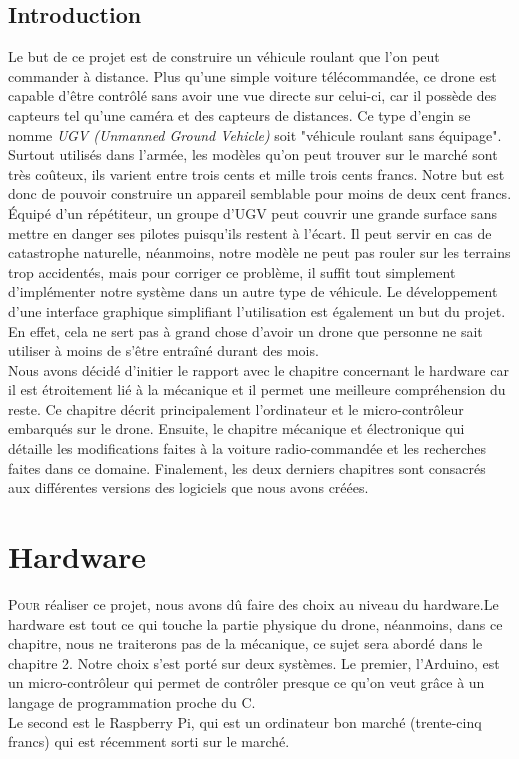 \documentclass[a4paper,11pt]{report}
\begin{document}
{\section*{Introduction}
Le but de ce projet est de construire un véhicule roulant que l'on peut commander à distance. Plus qu'une simple voiture télécommandée, ce drone est capable d'être contrôlé sans avoir une vue directe sur celui-ci, car il possède des capteurs tel qu'une caméra et des capteurs de distances. Ce type d'engin se nomme \textit{UGV (Unmanned Ground Vehicle)} soit "véhicule roulant sans équipage". Surtout utilisés dans l'armée, les modèles qu'on peut trouver sur le marché sont très coûteux, ils varient entre trois cents et mille trois cents francs. Notre but est donc de pouvoir construire un appareil semblable pour moins de deux cent francs. Équipé d'un répétiteur, un groupe d'UGV peut couvrir une grande surface sans mettre en danger ses pilotes puisqu'ils restent à l'écart. Il peut servir en cas de catastrophe naturelle, néanmoins, notre modèle ne peut pas rouler sur les terrains trop accidentés, mais pour corriger ce problème, il suffit tout simplement d'implémenter notre système dans un autre type de véhicule. Le développement d'une interface graphique simplifiant l'utilisation est également un but du projet. En effet, cela ne sert pas à grand chose d'avoir un drone que personne ne sait utiliser à moins de s'être entraîné durant des mois.\\
Nous avons décidé d'initier le rapport avec le chapitre concernant le hardware car il est étroitement lié à la mécanique et il permet une meilleure compréhension du reste. Ce chapitre décrit principalement l'ordinateur et le micro-contrôleur \cite{microcontroleur} embarqués sur le drone. Ensuite, le chapitre mécanique et électronique qui détaille les modifications faites à la voiture radio-commandée et les recherches faites dans ce domaine. Finalement, les deux derniers chapitres sont consacrés aux différentes versions des logiciels que nous avons créées.
\clearpage


\chapter{Hardware}


\lettrine{P}{our} réaliser ce projet, nous avons dû faire des choix au niveau du hardware.Le hardware est tout ce qui touche la partie physique du drone, néanmoins, dans ce chapitre, nous ne traiterons pas de la mécanique, ce sujet sera abordé dans le chapitre 2. Notre choix s'est porté sur deux systèmes. Le premier, l'Arduino, est un micro-contrôleur qui permet de contrôler presque ce qu'on veut grâce à un langage de programmation proche du C.\\
Le second est le Raspberry Pi, qui est un ordinateur bon marché (trente-cinq francs) qui est récemment sorti sur le marché. 


}
\end{document}
